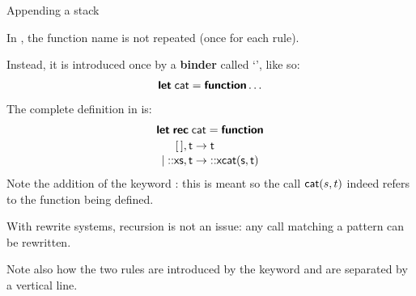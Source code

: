 %
\begin{frame}[fragile]{Appending a stack}

  In \OCaml, the function name is not repeated (once for each rule).

  \bigskip

  Instead, it is introduced once by a \textbf{binder} called `\Xlet',
  like so:
  \begin{equation*}
    \textsf{\textbf{let}} \; \textsf{cat} = \textsf{\textbf{function}} \ldots
  \end{equation*}
  The complete definition in \OCaml is:
  \begin{equation*}
    \begin{gathered}
      \Xlet\;\Xrec\;\ident{cat} = \Xfunction\\[-2pt]
      \begin{aligned}
        \el,\ident{t}
        &\rightarrow \ident{t}\\[-2pt]
        \mid\cons{\ident{x}}{\ident{s}},\ident{t}
        &\rightarrow
        \cons{\ident{x}}{\ident{cat}(\ident{s},\ident{t})}
      \end{aligned}
    \end{gathered}
  \end{equation*}
  Note the addition of the keyword \Xrec: this is meant so the call
  \(\textsf{cat}(s,t)\) indeed refers to the function being defined.

  \bigskip

  With rewrite systems, recursion is not an issue: any call matching a
  pattern can be rewritten.

  \bigskip

  Note also how the two rules are introduced by the keyword \Xfunction
  and are separated by a vertical line.

\end{frame}

